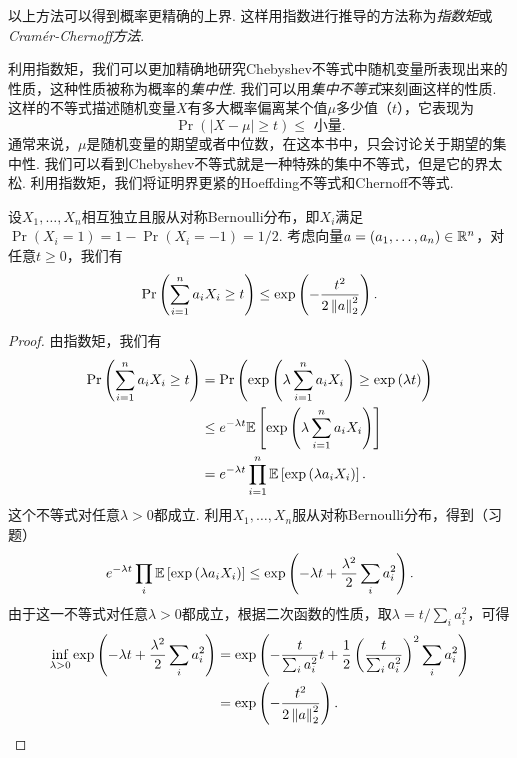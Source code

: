 以上方法可以得到概率更精确的上界. 这样用指数进行推导的方法称为\emph{指数矩}或\emph{Cramér-Chernoff方法}. 

利用指数矩，我们可以更加精确地研究Chebyshev不等式中随机变量所表现出来的性质，这种性质被称为概率的\emph{集中性}. 我们可以用\emph{集中不等式}来刻画这样的性质. 这样的不等式描述随机变量$X$有多大概率偏离某个值$\mu$多少值（$t$），它表现为
\[
\Pr(| X - \mu| \geq t) \leq \text{ 小量}.
\]
通常来说，$\mu$是随机变量的期望或者中位数，在这本书中，只会讨论关于期望的集中性. 我们可以看到Chebyshev不等式就是一种特殊的集中不等式，但是它的界太松. 利用指数矩，我们将证明界更紧的Hoeffding不等式和Chernoff不等式. 

\begin{theorem}\label{thm:hoeffding-inequality}
    设$X_1, \dots, X_n$相互独立且服从对称Bernoulli分布，即$X_i$满足$\Pr(X_i=1)=1-\Pr(X_i=-1)=1/2$. 考虑向量$a = (a_1, \dots, a_n) \in \mathbb{R}^n$，对任意$t\geq0$，我们有
    \[
        \Pr\left(\sum_{i=1}^n a_i X_i \geq t\right)\leq \exp \left( - \frac{t^2}{2\left\|a\right\|^2_2}\right).
    \]
\end{theorem}
\begin{proof}
由指数矩，我们有
\[
\begin{aligned}
    \Pr\left(\sum_{i=1}^n a_i X_i \geq t\right) &= \Pr\left(\exp\left(\lambda \sum_{i=1}^n a_i X_i\right) \geq \exp\left(\lambda t\right)\right) \\
    &\leq e^{-\lambda t} \mathbb{E} \left[\exp\left(\lambda \sum_{i=1}^n a_i X_i\right)\right]\\
    &=  e^{-\lambda t}\prod_{i=1}^n \mathbb{E}\left[\exp\left(\lambda a_i X_i\right)\right].
\end{aligned}
\]
这个不等式对任意$\lambda > 0$都成立. 
利用$X_1, \dots, X_n$服从对称Bernoulli分布，得到（习题）
\begin{equation}
e^{-\lambda t}\prod_{i} \mathbb{E}\left[\exp\left(\lambda a_i X_i\right)\right]\leq\exp \left(-\lambda t + \frac{\lambda^2}{2} \sum_{i} a_i^2\right).\label{eq:exponential-moment}
\end{equation}
由于这一不等式对任意$\lambda > 0$都成立，根据二次函数的性质，取$\lambda = t / \sum_i a_i^2$，可得
\[
\begin{aligned}
    \inf_{\lambda>0}\exp \left(-\lambda t + \frac{\lambda^2}{2} \sum_{i} a_i^2\right) &=\exp\left( -\frac{t}{\sum_i a_i^2} t + \frac12 \left(\frac{t}{\sum_i a_i^2}\right)^2 \sum_{i} a_i^2\right) \\
    &= \exp \left( - \frac{t^2}{2\left\|a\right\|_2^2}\right).
\end{aligned}
\]
\end{proof}


